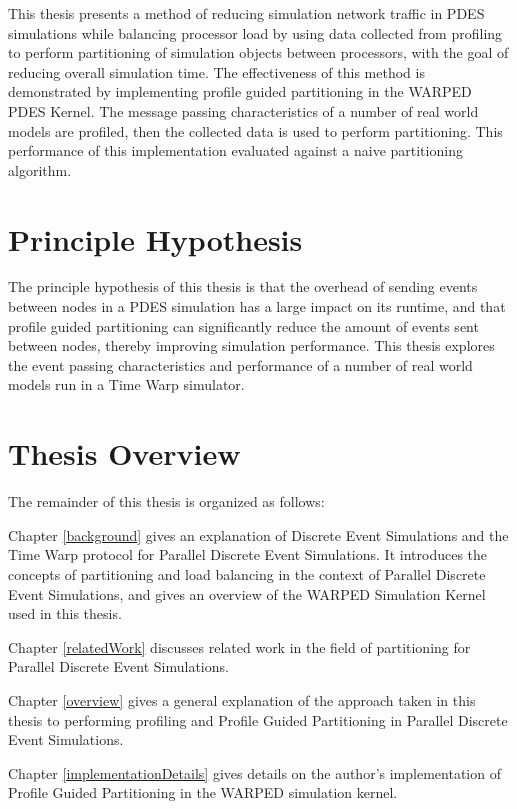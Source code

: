 \documentclass[11pt]{book}
\begin{document}
This thesis presents a method of reducing simulation network traffic in PDES simulations while balancing processor load by using data collected from profiling to perform partitioning of simulation objects between processors, with the goal of reducing overall simulation time. The effectiveness of this method is demonstrated by implementing profile guided partitioning in the WARPED PDES Kernel. The message passing characteristics of a number of real world models are profiled, then the collected data is used to perform partitioning. This performance of this implementation evaluated against a naive partitioning algorithm.


\section{Principle Hypothesis}

The principle hypothesis of this thesis is that the overhead of sending events between nodes in a PDES simulation has a large impact on its runtime, and that profile guided partitioning can significantly reduce the amount of events sent between nodes, thereby improving simulation performance. This thesis explores the event passing characteristics and performance of a number of real world models run in a Time Warp simulator.

\section{Thesis Overview}

The remainder of this thesis is organized as follows:

Chapter \ref{background} gives an explanation of Discrete Event Simulations and the Time Warp protocol for Parallel Discrete Event Simulations. It introduces the concepts of partitioning and load balancing in the context of Parallel Discrete Event Simulations, and gives an overview of the WARPED Simulation Kernel used in this thesis.

Chapter \ref{relatedWork} discusses related work in the field of partitioning for Parallel Discrete Event Simulations.

Chapter \ref{overview} gives a general explanation of the approach taken in this thesis to performing profiling and Profile Guided Partitioning in Parallel Discrete Event Simulations.

Chapter \ref{implementationDetails} gives details on the author's implementation of Profile Guided Partitioning in the WARPED simulation kernel.
\end{document}
